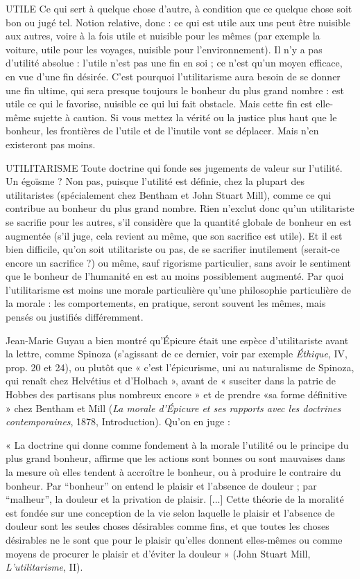 UTILE Ce qui sert à quelque chose d’autre, à condition que ce quelque
chose soit bon ou jugé tel. Notion relative, donc : ce qui est utile
aux uns peut être nuisible aux autres, voire à la fois utile et nuisible pour les
mêmes (par exemple la voiture, utile pour les voyages, nuisible pour l’environnement).
Il n’y a pas d’utilité absolue : l’utile n’est pas une fin en soi ; ce n’est
qu'un moyen efficace, en vue d’une fin désirée. C’est pourquoi l’utilitarisme
aura besoin de se donner une fin ultime, qui sera presque toujours le bonheur
du plus grand nombre : est utile ce qui le favorise, nuisible ce qui lui fait obstacle.
Mais cette fin est elle-même sujette à caution. Si vous mettez la vérité ou
la justice plus haut que le bonheur, les frontières de l’utile et de l’inutile vont
se déplacer. Mais n’en existeront pas moins.

UTILITARISME Toute doctrine qui fonde ses jugements de valeur sur l’utilité.
Un égoïsme ? Non pas, puisque l’utilité est définie,
chez la plupart des utilitaristes (spécialement chez Bentham et John Stuart
Mill), comme ce qui contribue au bonheur du plus grand nombre. Rien
n'exclut donc qu’un utilitariste se sacrifie pour les autres, s’il considère que la
quantité globale de bonheur en est augmentée (s’il juge, cela revient au même,
que son sacrifice est utile). Et il est bien difficile, qu’on soit utilitariste ou pas,
de se sacrifier inutilement (serait-ce encore un sacrifice ?) ou même, sauf rigorisme
particulier, sans avoir le sentiment que le bonheur de l'humanité en est
au moins possiblement augmenté. Par quoi l’utilitarisme est moins une morale
particulière qu’une philosophie particulière de la morale : les comportements,
en pratique, seront souvent les mêmes, mais pensés ou justifiés différemment.

Jean-Marie Guyau a bien montré qu’Épicure était une espèce d’utilitariste
avant la lettre, comme Spinoza (s'agissant de ce dernier, voir par exemple
{\it Éthique}, IV, prop. 20 et 24), ou plutôt que « c’est l’épicurisme, uni au naturalisme
de Spinoza, qui renaît chez Helvétius et d’Holbach », avant de « susciter
dans la patrie de Hobbes des partisans plus nombreux encore » et de prendre
«sa forme définitive » chez Bentham et Mill ({\it La morale d'Épicure et ses rapports
avec les doctrines contemporaines}, 1878, Introduction). Qu’on en juge :

« La doctrine qui donne comme fondement à la morale l'utilité ou le principe du
plus grand bonheur, affirme que les actions sont bonnes ou sont mauvaises dans la
mesure où elles tendent à accroître le bonheur, ou à produire le contraire du bonheur.
Par “bonheur” on entend le plaisir et l’absence de douleur ; par “malheur”, la douleur
et la privation de plaisir. [...] Cette théorie de la moralité est fondée sur une conception
de la vie selon laquelle le plaisir et l’absence de douleur sont les seules choses désirables
comme fins, et que toutes les choses désirables ne le sont que pour le plaisir qu’elles
donnent elles-mêmes ou comme moyens de procurer le plaisir et d’éviter la douleur »
(John Stuart Mill, {\it L'utilitarisme}, II).


